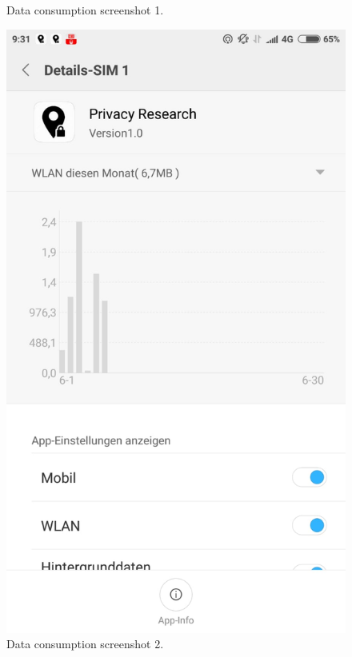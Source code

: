 \begin{figure}
\begin{minipage}{.45\textwidth}
\begin{center}
		\caption{Data consumption screenshot 1.}
		\end{center}
	\end{minipage}
	\hfill
	\begin{minipage}{.45\textwidth}
		\begin{center}
		\includegraphics[width=\textwidth]{data/data-usage/data-usage2-1.jpeg}
		\caption{Data consumption screenshot 2.}
		\end{center}
	\end{minipage}
\end{figure}

